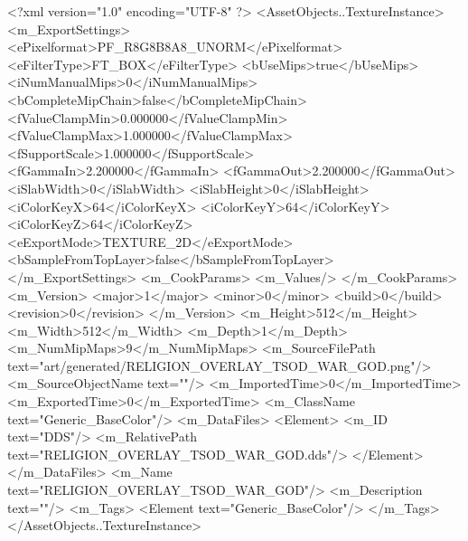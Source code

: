 <?xml version="1.0" encoding="UTF-8" ?>
<AssetObjects..TextureInstance>
	<m_ExportSettings>
		<ePixelformat>PF_R8G8B8A8_UNORM</ePixelformat>
		<eFilterType>FT_BOX</eFilterType>
		<bUseMips>true</bUseMips>
		<iNumManualMips>0</iNumManualMips>
		<bCompleteMipChain>false</bCompleteMipChain>
		<fValueClampMin>0.000000</fValueClampMin>
		<fValueClampMax>1.000000</fValueClampMax>
		<fSupportScale>1.000000</fSupportScale>
		<fGammaIn>2.200000</fGammaIn>
		<fGammaOut>2.200000</fGammaOut>
		<iSlabWidth>0</iSlabWidth>
		<iSlabHeight>0</iSlabHeight>
		<iColorKeyX>64</iColorKeyX>
		<iColorKeyY>64</iColorKeyY>
		<iColorKeyZ>64</iColorKeyZ>
		<eExportMode>TEXTURE_2D</eExportMode>
		<bSampleFromTopLayer>false</bSampleFromTopLayer>
	</m_ExportSettings>
	<m_CookParams>
		<m_Values/>
	</m_CookParams>
	<m_Version>
		<major>1</major>
		<minor>0</minor>
		<build>0</build>
		<revision>0</revision>
	</m_Version>
	<m_Height>512</m_Height>
	<m_Width>512</m_Width>
	<m_Depth>1</m_Depth>
	<m_NumMipMaps>9</m_NumMipMaps>
	<m_SourceFilePath text="art/generated/RELIGION_OVERLAY_TSOD_WAR_GOD.png"/>
	<m_SourceObjectName text=""/>
	<m_ImportedTime>0</m_ImportedTime>
	<m_ExportedTime>0</m_ExportedTime>
	<m_ClassName text="Generic_BaseColor"/>
	<m_DataFiles>
		<Element>
			<m_ID text="DDS"/>
			<m_RelativePath text="RELIGION_OVERLAY_TSOD_WAR_GOD.dds"/>
		</Element>
	</m_DataFiles>
	<m_Name text="RELIGION_OVERLAY_TSOD_WAR_GOD"/>
	<m_Description text=""/>
	<m_Tags>
		<Element text="Generic_BaseColor"/>
	</m_Tags>
</AssetObjects..TextureInstance>
